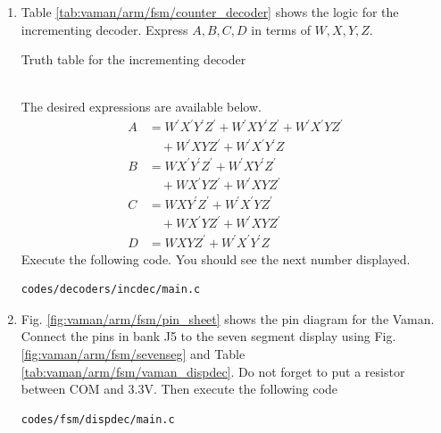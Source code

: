 \documentclass[journal,12pt,twocolumn]{IEEEtran}
\renewcommand\thesection{\arabic{section}}
\renewcommand\thesubsection{\thesection.\arabic{subsection}}
\begin{document}
\begin{enumerate}[label=\thesubsection.\arabic*.,ref=\thesubsection.\theenumi]

\item Table \ref{tab:vaman/arm/fsm/counter_decoder} shows the logic for the incrementing decoder.  Express $A,B,C,D$ in terms of $W,X,Y,Z$.
\label{prob:vaman/arm/fsm/counter_decoder}
\begin{table}
\centering

\caption{Truth table for the incrementing decoder}
\label{tab:vaman/arm/fsm/counter_decoder}
\end{table}
\\
\solution The desired expressions are available below. 
\begin{align}
\label{eq:vaman/arm/fsm/inc_A}
A &= W^{\prime}X^{\prime}Y^{\prime}Z^{\prime} + W^{\prime}XY^{\prime}Z^{\prime}
+W^{\prime}X^{\prime}YZ^{\prime}
\nonumber \\
 & \quad +W^{\prime}XYZ^{\prime}
+W^{\prime}X^{\prime}Y^{\prime}Z
\\
\label{eq:vaman/arm/fsm/inc_B}
B &= WX^{\prime}Y^{\prime}Z^{\prime} + W^{\prime}XY^{\prime}Z^{\prime}
\nonumber \\ 
& \quad 
+WX^{\prime}YZ^{\prime}
+W^{\prime}XYZ^{\prime}
\\
\label{eq:vaman/arm/fsm/inc_C}
C &= WXY^{\prime}Z^{\prime} + W^{\prime}X^{\prime}YZ^{\prime}
\nonumber \\ 
& \quad 
+WX^{\prime}YZ^{\prime}
+W^{\prime}XYZ^{\prime}
\\
D &= WXYZ^{\prime} + W^{\prime}X^{\prime}Y^{\prime}Z
\label{eq:vaman/arm/fsm/inc_D}
\end{align}
Execute the following code.  You should see the next number displayed.

\begin{lstlisting}
codes/decoders/incdec/main.c
\end{lstlisting}
%
%
\item Fig. \ref{fig:vaman/arm/fsm/pin_sheet} shows the pin diagram for the Vaman.  Connect the pins in bank J5 to the seven segment display using
Fig. \ref{fig:vaman/arm/fsm/sevenseg} and Table \ref{tab:vaman/arm/fsm/vaman_dispdec}.  Do not forget to put a resistor between COM and 3.3V.  Then execute the following code 
\begin{lstlisting}
codes/fsm/dispdec/main.c
\end{lstlisting}
%


\end{enumerate}
\end{document}
